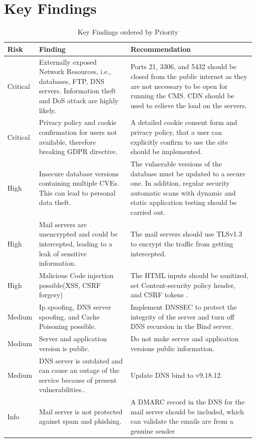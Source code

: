 \newpage
\section{Key Findings}
\begingroup
\centering
\setlength{\tabcolsep}{6.5pt} %
\renewcommand{\arraystretch}{1.8} %
\begin{longtable}{ |p{1.5cm}| p{6cm}|p{6.3cm}|}
\caption{Key Findings ordered by Priority}
    \label{table:key_findings}
\hline
\rowcolor{grey!15}
\textbf{Risk}  & \textbf{Finding}& \textbf{Recommendation}\\
\hline
\cellcolor{red!95} Critical  & Externally exposed Network Resources, i.e., databases, FTP, DNS servers. Information theft and DoS attack are highly likely.
 & Ports 21, 3306, and 5432 should be closed from the public internet as they are not necessary to be open for running the CMS. CDN should be used to relieve the load on the servers.
\\
\hline
\cellcolor{red!95} Critical  & Privacy policy and cookie confirmation for users not available, therefore breaking GDPR directive. & A detailed cookie consent form and privacy policy, that a user can explicitly confirm to use the site should be implemented.
\\
\hline
\cellcolor{red!70} High  & Insecure database versions  containing multiple CVEs. This can lead to personal data theft.
 & The vulnerable versions of the database must be updated to a secure one. In addition, regular security automatic scans with dynamic and static application testing should be carried out.
\\
\hline
\cellcolor{red!70} High  & Mail servers are unencrypted and could be intercepted, leading to a leak of sensitive information. & The mail servers should use TLSv1.3 to encrypt the traffic from getting intercepted. 
\\
\hline
\cellcolor{red!70} High  & Malicious Code injection possible(XSS, CSRF forgery) & The HTML inputs should be sanitized, set Content-security policy header, and CSRF tokens \citep[p.~75]{xss_crsf}.
\\
\hline
\cellcolor{yellow!95} Medium  & Ip spoofing, DNS server spoofing, and Cache Poisoning possible.
& Implement DNSSEC to protect the integrity of the server and turn off DNS recursion in the Bind server. \citep[p.~38]{guo2006spoof}
\\
\hline
\cellcolor{yellow!95} Medium  & Server and application version is public.& Do not make server and application versions public information.
\\
\hline
\cellcolor{yellow!95} Medium  & DNS server is outdated and can cause an outage of the service because of present vulnerabilities..& Update DNS bind to v9.18.12.
\\
\hline
\cellcolor{grey!55} Info  & Mail server is not protected against spam and phishing.& A DMARC record in the DNS for the mail server should be included, which can validate the emails are from a genuine sender
\\
\hline
\end{longtable}
\endgroup


